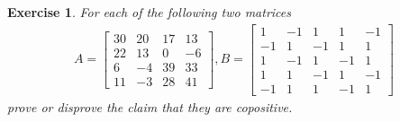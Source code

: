 \documentclass[12pt]{article}
\theoremstyle{colon}
\newtheorem{exercise}{Exercise}
\begin{document}
\clearpage

\begin{exercise}
  For each of the following two matrices
  \begin{gather*}
    A = \begin{bmatrix}
      30 & 20 & 17 & 13 \\
      22 & 13 & 0 & -6 \\
      6 & -4 & 39 & 33 \\
      11 & -3 & 28 & 41
    \end{bmatrix}, B = \begin{bmatrix}
      1 & -1 & 1 & 1 & -1 \\
      -1 & 1 & -1 & 1 & 1 \\
      1 & -1 & 1 & -1 & 1 \\
      1 & 1 & -1 & 1 & -1 \\
      -1 & 1 & 1 & -1 & 1
    \end{bmatrix}
  \end{gather*}
  prove or disprove the claim that they are copositive.
\end{exercise}
\end{document}

